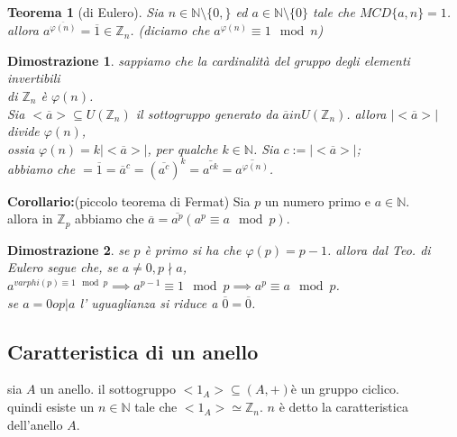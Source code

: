 \documentclass[a4paper,12pt]{article}
\theoremstyle{def}
\theoremstyle{prop}
\theoremstyle{esempio}
\theoremstyle{dimostrazione}
\newtheorem*{dimostrazione}{Dimostrazione}
\theoremstyle{teo}
\newtheorem*{teorema}{Teorema}
\theoremstyle{osservazione}
\begin{document}
\begin{teorema}[di Eulero]
    Sia \(n \in \mathbb{N} \setminus \{0,\}\) ed \(a \in \mathbb{N} \setminus \{0\}\) tale che \(MCD\{a,n\} = 1\).\\
    allora \(a^{\overline{\varphi(n)}} = \overline{1} \in \mathbb{Z}_n\). (diciamo che \(a^{\varphi(n)} \equiv 1 \mod n\))\\
\end{teorema}

\begin{dimostrazione}
    sappiamo che la cardinalità del gruppo degli elementi invertibili \\
    di \(\mathbb{Z}_n\) è \(\varphi(n)\).\\
    Sia \(<\overline{a}> \subseteq U(\mathbb{Z}_n)\) il sottogruppo generato da \(\overline{a} in U(\mathbb{Z}_n)\). allora \(|<\overline{a}>|\) divide \(\varphi(n)\),\\
    ossia \(\varphi(n) = k |<\overline{a}>|\), per qualche \(k \in \mathbb{N}\). Sia \(c := |<\overline{a}>|\);\\
    abbiamo che \( = \overline{1} = \overline{a}^c = (\overline{a^c})^k  = \overline{a^{ck}} = \overline{a^{\varphi(n)}} \).\\
\end{dimostrazione}

\textbf{Corollario:}(piccolo teorema di Fermat) Sia \(p\) un numero primo e \(a \in \mathbb{N}\).\\
allora in \(\mathbb{Z}_p\) abbiamo che \(\overline{a} = \overline{a^p} (a^p \equiv a \mod p)\).\\

\begin{dimostrazione}
    se \(p\) è primo si ha che \(\varphi(p) = p-1\). allora dal Teo. di Eulero segue che, se \(a \neq 0, p \nmid a\), \(a^{varphi(p) \equiv 1 \mod p}\implies a ^{p-1} \equiv 1 \mod p \implies a^p \equiv a \mod p\).\\
    se \(a = 0 o p | a\) l' uguaglianza si riduce a \(\overline{0} = \overline{0}\).
\end{dimostrazione}

\subsection{Caratteristica di un anello}
sia \(A\) un anello. il sottogruppo \(<1_A> \subseteq (A,+)\)è un gruppo ciclico.\\
quindi esiste un \(n \in \mathbb{N}\) tale che \(<1_A> \simeq \mathbb{Z}_n\). \(n\) è detto la caratteristica dell'anello \(A\).\\
\end{document}
